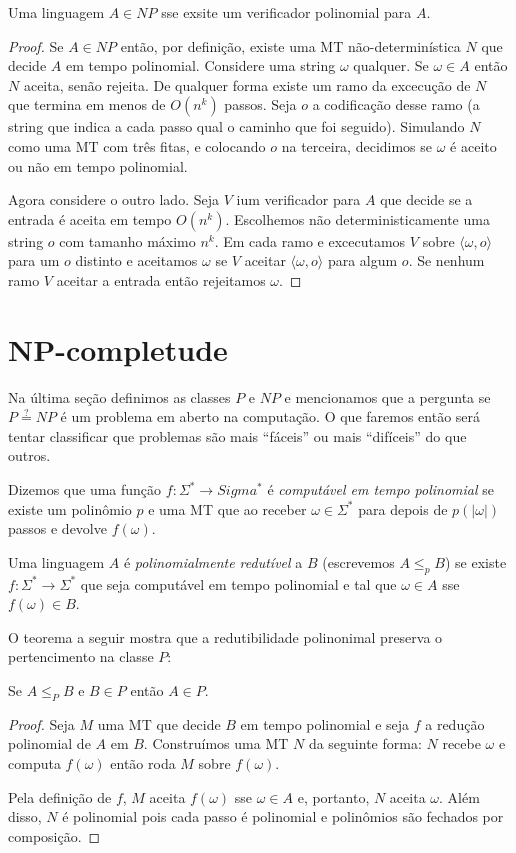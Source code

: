 \begin{theorem}
  Uma linguagem $A \in NP$ sse exsite um verificador polinomial para $A$.
\end{theorem}
\begin{proof}
  Se $A \in NP$ então, por definição, existe uma MT não-determinística $N$ que decide $A$ em tempo polinomial.
  Considere uma string $\omega$ qualquer.
  Se $\omega \in A$ então $N$ aceita, senão rejeita.
  De qualquer forma existe um ramo da excecução de $N$ que termina em menos de $O(n^k)$ passos.
  Seja $o$ a codificação desse ramo (a string que indica a cada passo qual o caminho que foi seguido).
  Simulando $N$ como uma MT com três fitas, e colocando $o$ na terceira, decidimos se $\omega$ é aceito ou não em tempo polinomial.

  Agora considere o outro lado.
  Seja $V$ ium verificador para $A$ que decide se a entrada é aceita em tempo $O(n^k)$.
  Escolhemos não deterministicamente uma string $o$ com tamanho máximo $n^k$.
  Em cada ramo e excecutamos $V$ sobre $\langle \omega, o \rangle$ para um $o$ distinto e aceitamos $\omega$ se $V$ aceitar $\langle \omega, o \rangle$ para algum $o$.
  Se nenhum ramo $V$ aceitar a entrada então rejeitamos $\omega$.
\end{proof}

\section{NP-completude}
\label{sec:np-completude}

Na última seção definimos as classes $P$ e $NP$ e mencionamos que a pergunta se $P \stackrel{?}{=} NP$ é um problema em aberto na computação.
O que faremos então será tentar classificar que problemas são mais ``fáceis'' ou mais ``difíceis'' do que outros.

Dizemos que uma função $f : \Sigma^* \to Sigma^*$ é {\em computável em tempo polinomial} se existe um polinômio $p$ e uma MT que ao receber $\omega \in \Sigma^*$ para depois de $p(|\omega|)$ passos e devolve $f(\omega)$.

Uma linguagem $A$ é {\em polinomialmente redutível} a $B$ (escrevemos $A \leq_p B$) se existe $f: \Sigma^* \to \Sigma^*$ que seja computável em tempo polinomial e tal que $\omega \in A$ sse $f(\omega) \in B$.

O teorema a seguir mostra que a redutibilidade polinonimal preserva o pertencimento na classe $P$:

\begin{theorem}
  Se $A \leq_P B$ e $B \in P$ então $A \in P$.
\end{theorem}
\begin{proof}
  Seja $M$ uma MT que decide $B$ em tempo polinomial e seja $f$ a redução polinomial de $A$ em $B$.
  Construímos uma MT $N$ da seguinte forma: $N$ recebe $\omega$ e computa $f(\omega)$ então roda $M$ sobre $f(\omega)$.

  Pela definição de $f$, $M$ aceita $f(\omega)$ sse $\omega \in A$ e, portanto, $N$ aceita $\omega$.
  Além disso, $N$ é polinomial pois cada passo é polinomial e polinômios são fechados por composição.
\end{proof}

